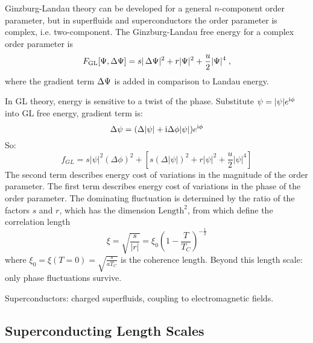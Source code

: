 \documentclass[../notes.tex]{subfiles}
\begin{document}
Ginzburg-Landau theory can be developed for a general \(n\)-component order parameter, but in superfluids and superconductors the order parameter is complex, i.e. two-component.
The Ginzburg-Landau free energy for a complex order parameter is
\begin{equation}
	F_{\mathrm{GL}} [\Psi, \adif{\Psi}] = s \vert \adif{\Psi} \vert^2 + r \vert \Psi \vert^2 + \frac{u}{2} \vert \Psi \vert^4 \;,
\end{equation}
where the gradient term \(\adif{\Psi}\) is added in comparison to Landau energy.

In GL theory, energy is sensitive to a twist of the phase.
Substitute \(\psi = \vert \psi \vert e^{\mathrm{i} \phi}\) into GL free energy, gradient term is:
\begin{equation}
	\Delta \psi = (\Delta \vert \psi \vert + \mathrm{i} \Delta \phi \vert \psi \vert) e^{\mathrm{i} \phi}
\end{equation}
So:
\begin{equation}
	f_{GL}  = s \vert \psi \vert^2 (\Delta \phi)^2 + \left[ s (\Delta \vert \psi \vert)^2 + r \vert \psi \vert^2 + \frac{u}{2} \vert \psi \vert^4 \right]
\end{equation}
The second term describes energy cost of variations in the magnitude of the order parameter.
The first term describes energy cost of variations in the phase of the order parameter.
The dominating fluctuation is determined by the ratio of the factors \(s\) and \(r\), which has the dimension \(\mathrm{Length}^2\), from which define the correlation length
\begin{equation}
	\xi = \sqrt{\frac{s}{\vert r \vert}} = \xi_0 \left(1 - \frac{T}{T_C}\right)^{-\frac{1}{2}}
\end{equation}
where \(\xi_0 = \xi(T=0) = \sqrt{\frac{s}{a T_C}}\) is the coherence length.
Beyond this length scale: only phase fluctuations survive.

Superconductors: charged superfluids, coupling to electromagnetic fields.




\subsection{Superconducting Length Scales}
\end{document}
